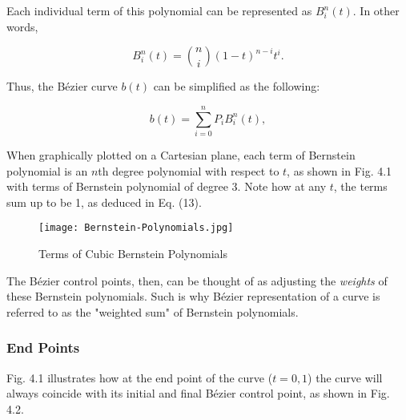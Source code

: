 \documentclass[12pt, oneside]{article}   	%
\numberwithin{figure}{section}
\begin{document}
Each individual term of this polynomial can be represented as \(B_{i}^{n}(t)\). In other words,

\begin{equation}
B_{i}^{n}(t) = \binom{n}{i}(1-t)^{n-i}t^i.
\end{equation}

Thus, the B\'{e}zier curve \(b(t)\) can be simplified as the following:

\begin{equation}
b(t) = \displaystyle\sum_{i=0}^{n}P_i B_{i}^{n}(t),
\end{equation}

When graphically plotted on a Cartesian plane, each term of Bernstein polynomial is an \(n\)th degree polynomial with respect to \(t\), as shown in Fig. 4.1 with terms of Bernstein polynomial of degree 3. Note how at any \(t\), the terms sum up to be 1, as deduced in Eq. (13).

\begin{figure}
\begin{center}
\texttt{[image: Bernstein-Polynomials.jpg]}
\end{center}

\caption{Terms of Cubic Bernstein Polynomials}
\end{figure}

The B\'{e}zier control points, then, can be thought of as adjusting the \textit{weights} of these Bernstein polynomials. Such is why B\'{e}zier representation of a curve is referred to as the "weighted sum" \cite{PRAUTZ:2013} of Bernstein polynomials.

\subsubsection{End Points}

Fig. 4.1 illustrates how at the end point of the curve (\(t=0,1\)) the curve will always coincide with its initial and final B\'{e}zier control point, as shown in Fig. 4.2.
\end{document}
